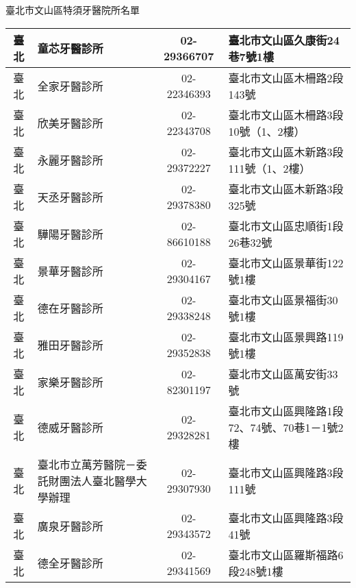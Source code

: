 臺北市文山區特須牙醫院所名單\\
\begin{tabularx}{1.0625\textwidth}{|c|p{3.2cm}|c|l|}
\hline
臺北&	童芯牙醫診所&	02-29366707 &	臺北市文山區久康街24巷7號1樓\\
\hline
臺北&	全家牙醫診所&	02-22346393 &	臺北市文山區木柵路2段143號\\
\hline
臺北 &	欣美牙醫診所 &	02-22343708 &	臺北市文山區木柵路3段10號（1、2樓）\\
\hline
臺北 &	永麗牙醫診所 &	02-29372227 &	臺北市文山區木新路3段111號（1、2樓）\\
\hline
臺北 &	天丞牙醫診所 &	02-29378380 &	臺北市文山區木新路3段325號\\
\hline
臺北 &	驊陽牙醫診所 &	02-86610188 &	臺北市文山區忠順街1段26巷32號\\
\hline
臺北 &	景華牙醫診所 &	02-29304167 &	臺北市文山區景華街122號1樓\\
\hline
臺北 &	德在牙醫診所 &	02-29338248 &	臺北市文山區景福街30號1樓\\
\hline
臺北 &	雅田牙醫診所 &	02-29352838 &	臺北市文山區景興路119號1樓\\
\hline
臺北 &	家樂牙醫診所 &	02-82301197 &	臺北市文山區萬安街33號\\
\hline
臺北 &	德威牙醫診所 &	02-29328281 &	臺北市文山區興隆路1段72、74號、70巷1－1號2樓\\
\hline
臺北 &	臺北市立萬芳醫院－委託財團法人臺北醫學大學辦理
&	02-29307930 &	臺北市文山區興隆路3段111號\\
\hline
臺北 &	廣泉牙醫診所 &	02-29343572 &	臺北市文山區興隆路3段41號\\
\hline
臺北 &	德全牙醫診所 &	02-29341569 &	臺北市文山區羅斯福路6段248號1樓\\
\hline
\end{tabularx}


